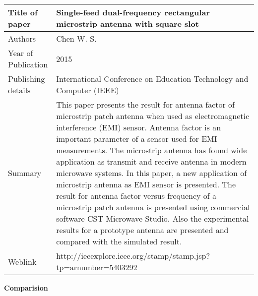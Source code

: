 		       \begin{center}
		       	\begin{table}[H]
		       		\centering
		       		\begin{tabular}{ |l|p{11cm}| }
		       			\hline
		       			Title of paper &  Single-feed dual-frequency rectangular microstrip antenna with square slot \\
		       			\hline
		       			Authors & Chen W. S. \\
		       			\hline
		       			Year of Publication & 2015 \\
		       			\hline
		       			Publishing details & International Conference on Education Technology and Computer (IEEE) \\ \hline
		       			Summary & This paper presents the result for antenna factor of microstrip patch antenna when used as electromagnetic interference (EMI) sensor. Antenna factor is an important parameter of a sensor used for EMI measurements. The microstrip antenna has found wide application as transmit and receive antenna in modern microwave systems. In this paper, a new application of microstrip antenna as EMI sensor is presented. The result for antenna factor versus frequency of a microstrip patch antenna is presented using commercial software CST Microwave Studio. Also the experimental results for a prototype antenna are presented and compared with the simulated result.\\
		       			\hline
		       			Weblink & http://ieeexplore.ieee.org/stamp/stamp.jsp?tp=arnumber=5403292 \\
		       			\hline			 
		       		\end{tabular}		
		       		
		       	\end{table}
		       \end{center}		 
		
		\cleardoublepage
		
			\begin{flushleft}
				\textbf{Comparision}
			\end{flushleft}
			

